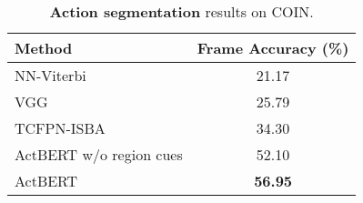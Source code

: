 \documentclass[10pt,twocolumn,letterpaper]{article}
\newcommand{\ours}{ActBERT\xspace}
\begin{document}
\begin{table}[tb]
\small
\centering
\begin{tabular}{l  c }
\toprule
Method & Frame Accuracy (\%) \\
\toprule
NN-Viterbi~\cite{richard2018neuralnetwork} & 21.17\\
VGG~\cite{simonyan2014very} & 25.79 \\
TCFPN-ISBA~\cite{ding2018weakly} & 34.30\\
\midrule 
\ours w/o region cues & 52.10 \\
\ours & \textbf{56.95} \\
\bottomrule
\end{tabular}
\caption{\textbf{Action segmentation} results on COIN.} \label{tab:action_segmentation}
\end{table}
\end{document}
